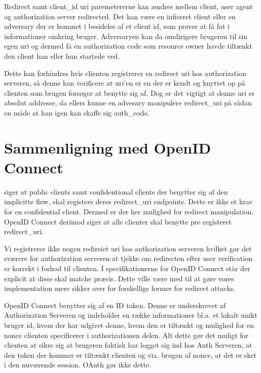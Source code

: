\documentclass[a4paper,12pt]{article}
\theoremstyle{plain}
\theoremstyle{nonumberplain}
\begin{document}
Redirect samt client\_id uri paremetererne kan ændres mellem client, user agent og authorization server redirected. Det kan være en inficeret client eller en adversary der er kommet i besidelse af et client id, som prøver at få fat i informationer omkring bruger. Adversaryen kan da omdirigere brugeren til sin egen uri og dermed få en authorization code som resource owner havde tiltænkt den client han eller hun startede ved.

 Dette kan forhindres hvis clienten registrerer en redirect uri hos authorization serveren, så denne kan verificere at uri'en er en der er kendt og knyttet op på clienten som brugen forsøger at benytte sig af. Dog er det vigtigt at denne uri er absolut addresse, da ellers kunne en advesary manipulere redirect\_uri på sådan en måde at han igen kan skaffe sig auth\_code.


\section*{Sammenligning med OpenID Connect}
\cite[Section 3.1.2.2]{rfc6749} siger at public clients samt confidentional clients der benytter sig af den implicitte flow, skal registere deres redirect\_uri endpoints. Dette er ikke et krav for en confidential client. Dermed er der her mulighed for redirect manipulation. OpenID Connect derimod siger at alle clienter skal benytte pre registeret redirect\_uri.

Vi registrerer ikke nogen redireict uri hos authorization serveren hvilket gør det sværere for authorization serveren at tjekke om redirecten efter user verification er korrekt i forhod til clienten. I specifikationerne for OpenID Connect står der explicit at disse skal matche præcis.
Dette ville være med til at gøre vores implementation mere sikker over for forskellige former for redirect attacks.

OpenID Connect benytter sig af en ID token. Denne er underskrevet af Authorization Serveren og indeholder en række informationer bl.a. et lokalt unikt bruger id, hvem der har udgivet denne, hvem den er tiltænkt og mulighed for en nonce clienten specificerer i authorizationen delen. Alt dette gør det muligt for clienten at sikre sig at brugeren faktisk har logget sig ind hos Auth Serveren, at den token der kommer er tiltænkt clienten og via. brugen af nonce, at det er sket i den nuværende session. OAuth gør ikke dette.
\end{document}
